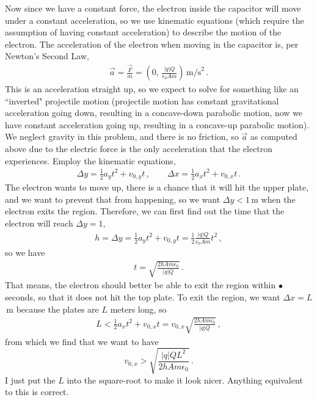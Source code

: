 \documentclass[11pt]{article}
\begin{document}
Now since we have a constant force, the electron inside the capacitor will move under a constant acceleration, so we use kinematic equations (which require the assumption of having constant acceleration) to describe the motion of the electron. The acceleration of the electron when moving in the capacitor is, per Newton's Second Law, 
\begin{align*}
\vec{a} = \frac{\vec{F}}{m} = \left(0,\, \frac{|q|Q}{\epsilon_0 Am} \right)\,\text{m/s}^2\,.
\end{align*}
This is an acceleration straight up, so we expect to solve for something like an ``inverted" projectile motion (projectile motion has constant gravitational acceleration going down, resulting in a concave-down parabolic motion, now we have constant acceleration going up, resulting in a concave-up parabolic motion). We neglect gravity in this problem, and there is no friction, so $\vec{a}$ as computed above due to the electric force is the only acceleration that the electron experiences. Employ the kinematic equations, 
\begin{align*}
\Delta y = \frac{1}{2}a_y t^2 + v_{0,y} t\,,\qquad
\Delta x = \frac{1}{2}a_x t^2 + v_{0,x} t\,.
\end{align*}
The electron wants to move up, there is a chance that it will hit the upper plate, and we want to prevent that from happening, so we want $\Delta y < 1$\,m when the electron exits the region. Therefore, we can first find out the time that the electron will reach $\Delta y = 1$, 
\begin{align*}
h=\Delta y = \frac{1}{2}a_y t^2 + v_{0,y}t = \frac{1}{2}\frac{|q|Q}{\epsilon_0 Am} t^2 \,,
\end{align*}
so we have
\begin{align*}
t = \sqrt{\frac{2h Am\epsilon_0}{|q|Q}}\,.
\end{align*}
That means, the electron should better be able to exit the region within $•$ seconds, so that it does not hit the top plate. To exit the region, we want $\Delta x = L$\,m because the plates are $L$ meters long, so 
\begin{align*}
L < \frac{1}{2}a_xt^2 + v_{0,x}t = v_{0,x}\sqrt{\frac{2h Am\epsilon_0}{|q|Q}} \,,
\end{align*}
from which we find that we want to have 
$$v_{0,x} > \sqrt{\frac{|q|QL^2}{2hAm\epsilon_0}}\,.$$ 
I just put the $L$ into the square-root to make it look nicer. Anything equivalent to this is correct. 
\end{document}
